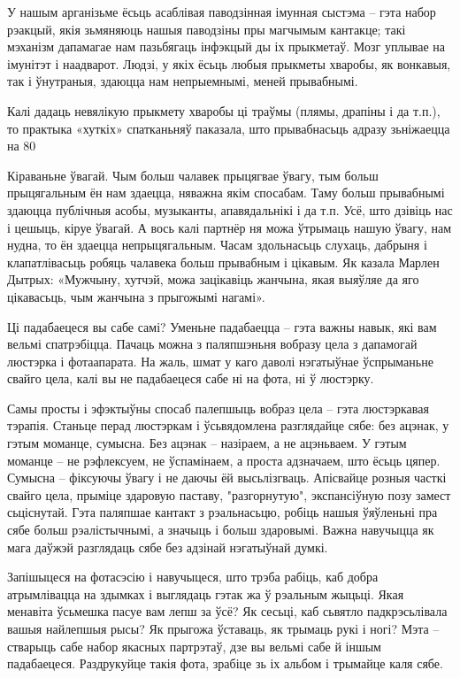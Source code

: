 У нашым арганізьме ёсьць асаблівая паводзінная імунная сыстэма – гэта набор рэакцый, якія зьмяняюць нашыя паводзіны пры магчымым кантакце; такі мэханізм дапамагае нам пазьбягаць інфэкцый ды іх прыкметаў. Мозг уплывае на імунітэт і наадварот. Людзі, у якіх ёсьць любыя прыкметы хваробы, як вонкавыя, так і ўнутраныя, здаюцца нам непрыемнымі, меней прывабнымі.

Калі дадаць невялікую прыкмету хваробы ці траўмы (плямы, драпіны і да т.п.), то практыка «хуткіх» спатканьняў паказала, што прывабнасьць адразу зьніжаецца на 80%

Кіраваньне ўвагай. Чым больш чалавек прыцягвае ўвагу, тым больш прыцягальным ён нам здаецца, няважна якім спосабам. Таму больш прывабнымі здаюцца публічныя асобы, музыканты, апавядальнікі і да т.п. Усё, што дзівіць нас і цешыць, кіруе ўвагай. А вось калі партнёр ня можа ўтрымаць нашую ўвагу, нам нудна, то ён здаецца непрыцягальным. Часам здольнасьць слухаць, дабрыня і клапатлівасьць робяць чалавека больш прывабным і цікавым. Як казала Марлен Дытрых: «Мужчыну, хутчэй, можа зацікавіць жанчына, якая выяўляе да яго цікавасьць, чым жанчына з прыгожымі нагамі».

Ці падабаецеся вы сабе самі? Уменьне падабаецца – гэта важны навык, які вам вельмі спатрэбіцца. Пачаць можна з паляпшэньня вобразу цела з дапамогай люстэрка і фотаапарата. На жаль, шмат у каго даволі нэгатыўнае ўспрыманьне свайго цела, калі вы не падабаецеся сабе ні на фота, ні ў люстэрку.

Самы просты і эфэктыўны спосаб палепшыць вобраз цела – гэта люстэркавая тэрапія. Станьце перад люстэркам і ўсьвядомлена разглядайце сябе: без ацэнак, у гэтым моманце, сумысна. Без ацэнак – назіраем, а не ацэньваем. У гэтым моманце – не рэфлексуем, не ўспамінаем, а проста адзначаем, што ёсьць цяпер. Сумысна – фіксуючы ўвагу і не даючы ёй высьлізгваць. Апісвайце розныя часткі свайго цела, прыміце здаровую паставу, "разгорнутую", экспансіўную позу замест сьціснутай. Гэта паляпшае кантакт з рэальнасьцю, робіць нашыя ўяўленьні пра сябе больш рэалістычнымі, а значыць і больш здаровымі. Важна навучыцца як мага даўжэй разглядаць сябе без адзінай нэгатыўнай думкі.

Запішыцеся на фотасэсію і навучыцеся, што трэба рабіць, каб добра атрымлівацца на здымках і выглядаць гэтак жа ў рэальным жыцьці. Якая менавіта ўсьмешка пасуе вам лепш за ўсё? Як сесьці, каб сьвятло падкрэсьлівала вашыя найлепшыя рысы? Як прыгожа ўставаць, як трымаць рукі і ногі? Мэта – стварыць сабе набор якасных партрэтаў, дзе вы вельмі сабе й іншым падабаецеся. Раздрукуйце такія фота, зрабіце зь іх альбом і трымайце каля сябе.

